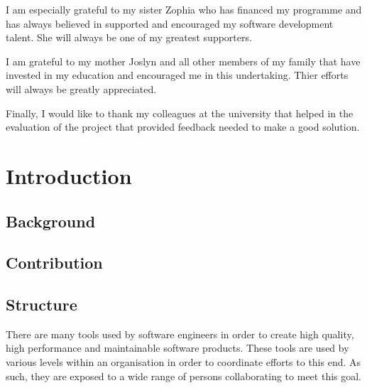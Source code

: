 \documentclass{mproj}
\begin{document}
I am especially grateful to my sister Zophia who has financed my programme and has always believed in supported and encouraged my software development talent. She will always be one of my greatest supporters.

I am grateful to my mother Joslyn and all other members of my family that have invested in my education and encouraged me in this undertaking. Thier efforts will always be greatly appreciated.

Finally, I would like to thank my colleagues at the university that helped in the evaluation of the project that provided feedback needed to make a good solution.

\tableofcontents




\chapter{Introduction}\label{intro}

\section{Background}

\section{Contribution}

\section{Structure}


There are many tools used by software engineers in order to create high quality, high performance and maintainable software products. These tools are used by various levels within an organisation in order to coordinate efforts to this end. As such, they are exposed to a wide range of persons collaborating to meet this goal.
\end{document}
